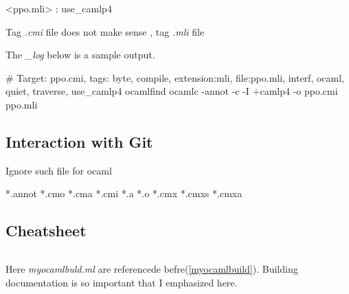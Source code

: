 \begin{bashcode}
<ppo.{mli}> : use_camlp4
\end{bashcode}

Tag \textit{.cmi} file does not make sense , tag \textit{.mli} file

The \textit{\_log} below is a sample output.

\begin{bashcode}
# Target: ppo.cmi, tags: { byte, compile, extension:mli, file:ppo.mli, interf, ocaml, quiet, traverse, use_camlp4 }
ocamlfind ocamlc -annot -c -I +camlp4 -o ppo.cmi ppo.mli
\end{bashcode}


\subsection{Interaction with Git}

Ignore such file for ocaml

\begin{bashcode}
*.annot
*.cmo
*.cma
*.cmi
*.a
*.o
*.cmx
*.cmxs
*.cmxa
\end{bashcode}

\subsection{Cheatsheet}

\inputminted[fontsize=\scriptsize]{bash}{code/scripts/mk_ocaml_prj}

Here \textit{myocamlbuld.ml} are referencede befre(\ref{myocamlbuild}).
Building documentation is so important that I emphasized here.


